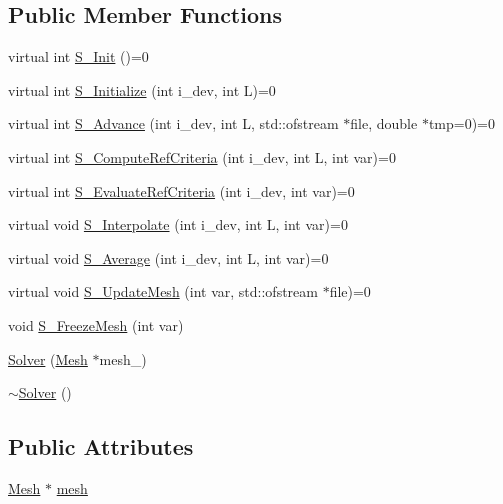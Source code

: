 \subsection*{Public Member Functions}
\begin{DoxyCompactItemize}
\item 
virtual int \hyperlink{classSolver_a354e0d709ec8c548be9e72add961c9f6}{S\+\_\+\+Init} ()=0
\item 
virtual int \hyperlink{classSolver_a52e834a160622462bec7c40054702270}{S\+\_\+\+Initialize} (int i\+\_\+dev, int L)=0
\item 
virtual int \hyperlink{classSolver_a4bbad207af5ea842a472a35049d4fbb9}{S\+\_\+\+Advance} (int i\+\_\+dev, int L, std\+::ofstream $\ast$file, double $\ast$tmp=0)=0
\item 
virtual int \hyperlink{classSolver_a28e21b098bfcf7c69a9664a8a4413960}{S\+\_\+\+Compute\+Ref\+Criteria} (int i\+\_\+dev, int L, int var)=0
\item 
virtual int \hyperlink{classSolver_a1b5b498836d6226bc425fb67bb7940d7}{S\+\_\+\+Evaluate\+Ref\+Criteria} (int i\+\_\+dev, int var)=0
\item 
virtual void \hyperlink{classSolver_a5b3e7308e48b43f75b09ddd425e11cfd}{S\+\_\+\+Interpolate} (int i\+\_\+dev, int L, int var)=0
\item 
virtual void \hyperlink{classSolver_a19b326267dbafa8b000b92a449c32b79}{S\+\_\+\+Average} (int i\+\_\+dev, int L, int var)=0
\item 
virtual void \hyperlink{classSolver_a8c73af137ee8c7ab25d8195448088a7b}{S\+\_\+\+Update\+Mesh} (int var, std\+::ofstream $\ast$file)=0
\item 
void \hyperlink{classSolver_a1ef012d41bd8d8f7f29fd15a8587dac9}{S\+\_\+\+Freeze\+Mesh} (int var)
\item 
\hyperlink{classSolver_a2608849f7c7dc3ec3e0c7b24e00712cf}{Solver} (\hyperlink{classMesh}{Mesh} $\ast$mesh\+\_\+)
\item 
\hyperlink{classSolver_aba52d3c92fafceb6fe39f937f2d73db3}{$\sim$\+Solver} ()
\end{DoxyCompactItemize}
\subsection*{Public Attributes}
\begin{DoxyCompactItemize}
\item 
\hyperlink{classMesh}{Mesh} $\ast$ \hyperlink{classSolver_a9b516765134fb4193329639761924cf7}{mesh}
\end{DoxyCompactItemize}


